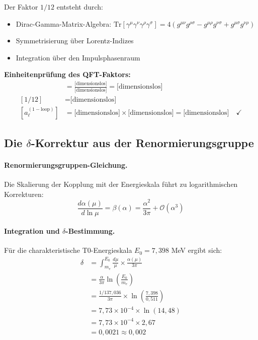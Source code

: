 \documentclass[12pt,a4paper]{article}
\theoremstyle{remark}
\begin{document}
Der Faktor $1/12$ entsteht durch:
\begin{itemize}
	\item Dirac-Gamma-Matrix-Algebra: $\text{Tr}[\gamma^\mu \gamma^\nu \gamma^\rho \gamma^\sigma] = 4(g^{\mu\nu}g^{\rho\sigma} - g^{\mu\rho}g^{\nu\sigma} + g^{\mu\sigma}g^{\nu\rho})$
	\item Symmetrisierung über Lorentz-Indizes
	\item Integration über den Impulsphasenraum
\end{itemize}

\begin{units}
	\textbf{Einheitenprüfung des QFT-Faktors:}
	\begin{align}
		[\alpha/(2\pi)] &= \frac{\text{[dimensionslos]}}{\text{[dimensionslos]}} = \text{[dimensionslos]} \\
		[1/12] &= \text{[dimensionslos]} \\
		[a_\ell^{(1-\text{loop})}] &= \text{[dimensionslos]} \times \text{[dimensionslos]} = \text{[dimensionslos]} \quad \checkmark
	\end{align}
\end{units}

\subsection{Die $\delta$-Korrektur aus der Renormierungsgruppe}

\paragraph{Renormierungsgruppen-Gleichung.}
Die Skalierung der Kopplung mit der Energieskala führt zu logarithmischen Korrekturen:
\begin{equation}
	\frac{d\alpha(\mu)}{d\ln\mu} = \beta(\alpha) = \frac{\alpha^2}{3\pi} + \mathcal{O}(\alpha^3)
\end{equation}

\paragraph{Integration und $\delta$-Bestimmung.}
Für die charakteristische T0-Energieskala $E_0 = 7{,}398$ MeV ergibt sich:
\begin{align}
	\delta &= \int_{m_e}^{E_0} \frac{d\mu}{\mu} \times \frac{\alpha(\mu)}{3\pi} \\
	&= \frac{\alpha}{3\pi} \ln\left(\frac{E_0}{m_e}\right) \\
	&= \frac{1/137{,}036}{3\pi} \times \ln\left(\frac{7{,}398}{0{,}511}\right) \\
	&= 7{,}73 \times 10^{-4} \times \ln(14{,}48) \\
	&= 7{,}73 \times 10^{-4} \times 2{,}67 \\
	&= 0{,}0021 \approx 0{,}002
\end{align}
\end{document}
